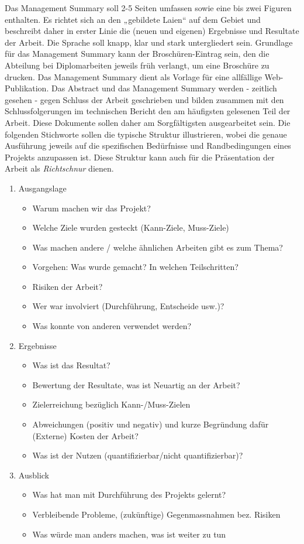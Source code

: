 Das Management Summary soll 2-5 Seiten umfassen sowie eine bis zwei Figuren enthalten. Es richtet sich an den „gebildete Laien“ auf dem Gebiet und beschreibt daher in erster Linie die (neuen und eigenen) Ergebnisse und Resultate der Arbeit. Die Sprache soll knapp, klar und stark untergliedert sein. 
Grundlage für das Management Summary kann der Broschüren-Eintrag sein, den die Abteilung bei Diplomarbeiten jeweils früh verlangt, um eine Broschüre zu drucken. Das Management Summary dient als Vorlage für eine allfällige Web-Publikation.
Das Abstract  und das Management Summary werden - zeitlich gesehen - gegen Schluss der Arbeit geschrieben und bilden zusammen mit den Schlussfolgerungen im technischen Bericht den am häufigsten gelesenen Teil der Arbeit. Diese Dokumente sollen daher am Sorgfältigsten ausgearbeitet sein.
Die folgenden Stichworte sollen die typische Struktur illustrieren, wobei die genaue Ausführung jeweils auf die spezifischen Bedürfnisse und Randbedingungen eines Projekts anzupassen ist. Diese Struktur kann auch für die Präsentation der Arbeit als \emph{Richtschnur} dienen. 
\begin{enumerate}
\item Ausgangslage
	\begin{itemize}
 		\item Warum machen wir das Projekt?
		\item Welche Ziele wurden gesteckt (Kann-Ziele, Muss-Ziele)
		\item Was machen andere / welche ähnlichen Arbeiten gibt es zum Thema?
		\item Vorgehen: Was wurde gemacht? In welchen Teilschritten?
		\item Risiken der Arbeit?
		\item Wer war involviert (Durchführung, Entscheide usw.)?
		\item Was konnte von anderen verwendet werden?
	\end{itemize}
\item Ergebnisse
	\begin{itemize}
 		\item Was ist das Resultat? 
 		\item Bewertung der Resultate, was ist Neuartig an der Arbeit?
 		\item Zielerreichung bezüglich Kann-/Muss-Zielen
 		\item Abweichungen (positiv und negativ) und kurze Begründung dafür (Externe) Kosten der Arbeit?
 		\item Was ist der Nutzen (quantifizierbar/nicht quantifizierbar)?
	\end{itemize}
\item Ausblick
	\begin{itemize}
 		\item Was hat man mit Durchführung des Projekts gelernt?
 		\item Verbleibende Probleme, (zukünftige) Gegenmassnahmen bez. Risiken
 		\item Was würde man anders machen, was ist weiter zu tun
 	\end{itemize}
\end{enumerate}